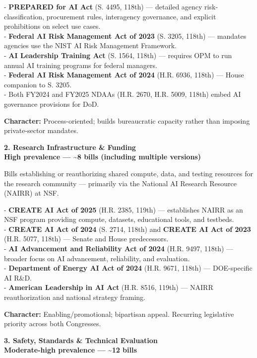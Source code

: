 \documentclass[11pt]{article}
\begin{document}
- \textbf{PREPARED for AI Act} (S. 4495, 118th) --- detailed agency risk-classification, procurement rules, interagency governance, and explicit prohibitions on select use cases. \\
- \textbf{Federal AI Risk Management Act of 2023} (S. 3205, 118th) --- mandates agencies use the NIST AI Risk Management Framework. \\
- \textbf{AI Leadership Training Act} (S. 1564, 118th) --- requires OPM to run annual AI training programs for federal managers. \\
- \textbf{Federal AI Risk Management Act of 2024} (H.R. 6936, 118th) --- House companion to S. 3205. \\
- Both FY2024 and FY2025 NDAAs (H.R. 2670, H.R. 5009, 118th) embed AI governance provisions for DoD.

\textbf{Character:} Process-oriented; builds bureaucratic capacity rather than imposing private-sector mandates.

\textbf{2. Research Infrastructure \& Funding} \\
\textbf{High prevalence --- \textasciitilde{}8 bills (including multiple versions)}

Bills establishing or reauthorizing shared compute, data, and testing resources for the research community --- primarily via the National AI Research Resource (NAIRR) at NSF.

- \textbf{CREATE AI Act of 2025} (H.R. 2385, 119th) --- establishes NAIRR as an NSF program providing compute, datasets, educational tools, and testbeds. \\
- \textbf{CREATE AI Act of 2024} (S. 2714, 118th) and \textbf{CREATE AI Act of 2023} (H.R. 5077, 118th) --- Senate and House predecessors. \\
- \textbf{AI Advancement and Reliability Act of 2024} (H.R. 9497, 118th) --- broader focus on AI advancement, reliability, and evaluation. \\
- \textbf{Department of Energy AI Act of 2024} (H.R. 9671, 118th) --- DOE-specific AI R\&D. \\
- \textbf{American Leadership in AI Act} (H.R. 8516, 119th) --- NAIRR reauthorization and national strategy framing.

\textbf{Character:} Enabling/promotional; bipartisan appeal. Recurring legislative priority across both Congresses.

\textbf{3. Safety, Standards \& Technical Evaluation} \\
\textbf{Moderate-high prevalence --- \textasciitilde{}12 bills}
\end{document}
